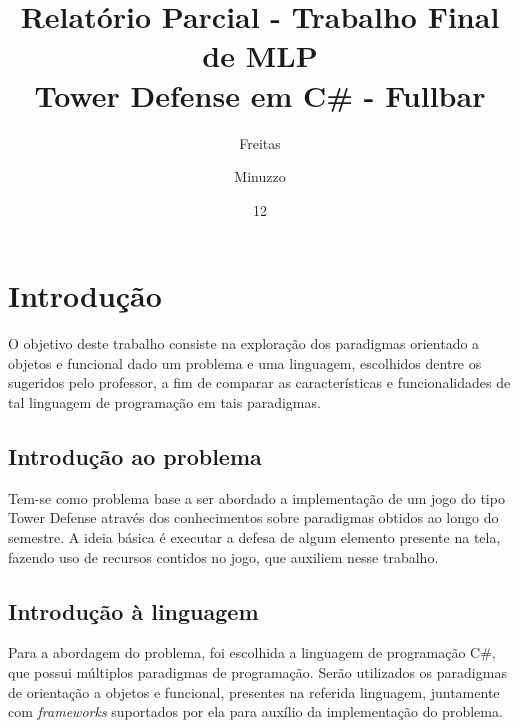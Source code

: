 \documentclass[rel_mlp]{iiufrgs}
\title{%
  Relatório Parcial - Trabalho Final de MLP \\
  \large Tower Defense em C\# - Fullbar}
\author{Freitas}{Pietra} %
\author{Minuzzo}{Thayná} %
\date{12}{2017}
\begin{document}
\maketitle      



\tableofcontents






%
\chapter{Introdução} \label{intro}

O objetivo deste trabalho consiste na exploração dos paradigmas orientado a objetos e funcional dado um problema e uma linguagem, escolhidos dentre os sugeridos pelo professor, a fim de comparar as características e funcionalidades de tal linguagem de programação em tais paradigmas. 

\section{Introdução ao problema}

Tem-se como problema base a ser abordado a implementação de um jogo do tipo Tower Defense através dos conhecimentos sobre paradigmas obtidos ao longo do semestre. A ideia básica é executar a defesa de algum elemento presente na tela, fazendo uso de recursos contidos no jogo, que auxiliem nesse trabalho.  

\section{Introdução à linguagem}

Para a abordagem do problema, foi escolhida a linguagem de programação C\#, que possui múltiplos paradigmas de programação. Serão utilizados os paradigmas de orientação a objetos e funcional, presentes na referida linguagem, juntamente com \textit{frameworks} suportados por ela para auxílio da implementação do problema.
\end{document}
